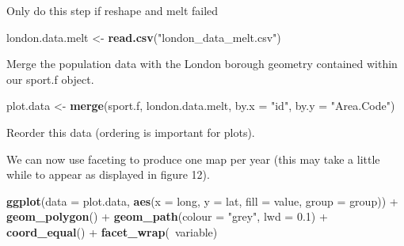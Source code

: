 \documentclass[]{article}
\newenvironment{Shaded}{}{}
\newcommand{\KeywordTok}[1]{\textcolor[rgb]{0.00,0.44,0.13}{\textbf{{#1}}}}
\newcommand{\DataTypeTok}[1]{\textcolor[rgb]{0.56,0.13,0.00}{{#1}}}
\newcommand{\FloatTok}[1]{\textcolor[rgb]{0.25,0.63,0.44}{{#1}}}
\newcommand{\StringTok}[1]{\textcolor[rgb]{0.25,0.44,0.63}{{#1}}}
\newcommand{\NormalTok}[1]{{#1}}
\begin{document}
Only do this step if reshape and melt failed

\begin{Shaded}
\begin{Highlighting}[]
\NormalTok{london.data.melt <-}\StringTok{ }\KeywordTok{read.csv}\NormalTok{(}\StringTok{"london_data_melt.csv"}\NormalTok{)}
\end{Highlighting}
\end{Shaded}

Merge the population data with the London borough geometry contained
within our sport.f object.

\begin{Shaded}
\begin{Highlighting}[]
\NormalTok{plot.data <-}\StringTok{ }\KeywordTok{merge}\NormalTok{(sport.f, london.data.melt, }\DataTypeTok{by.x =} \StringTok{"id"}\NormalTok{, }\DataTypeTok{by.y =} \StringTok{"Area.Code"}\NormalTok{)}
\end{Highlighting}
\end{Shaded}

Reorder this data (ordering is important for plots).

\begin{Shaded}
\end{Shaded}

We can now use faceting to produce one map per year (this may take a
little while to appear as displayed in figure 12).

\begin{Shaded}
\begin{Highlighting}[]
\KeywordTok{ggplot}\NormalTok{(}\DataTypeTok{data =} \NormalTok{plot.data, }\KeywordTok{aes}\NormalTok{(}\DataTypeTok{x =} \NormalTok{long, }\DataTypeTok{y =} \NormalTok{lat, }\DataTypeTok{fill =} \NormalTok{value, }\DataTypeTok{group =} \NormalTok{group)) +}\StringTok{ }
\StringTok{    }\KeywordTok{geom_polygon}\NormalTok{() +}\StringTok{ }\KeywordTok{geom_path}\NormalTok{(}\DataTypeTok{colour =} \StringTok{"grey"}\NormalTok{, }\DataTypeTok{lwd =} \FloatTok{0.1}\NormalTok{) +}\StringTok{ }\KeywordTok{coord_equal}\NormalTok{() +}\StringTok{ }
\StringTok{    }\KeywordTok{facet_wrap}\NormalTok{(~variable)}
\end{Highlighting}
\end{Shaded}
\end{document}
